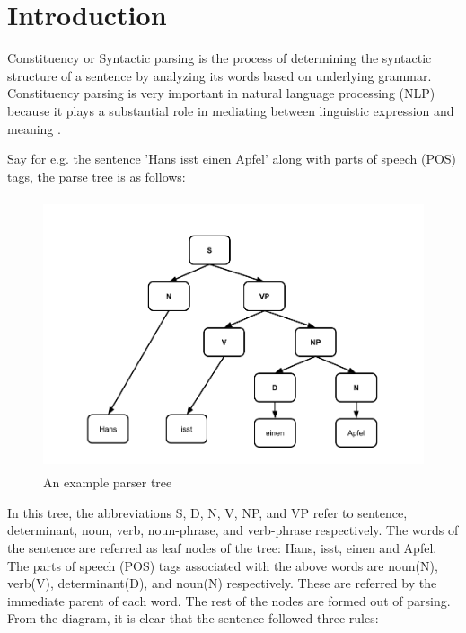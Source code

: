 \documentclass[a4paper, 11pt]{article}
\begin{document}
\tableofcontents
\pagebreak

\listoffigures
\pagebreak

\listoftables
\pagebreak

\clearpage

\section{Introduction}
\frenchspacing

Constituency or Syntactic parsing is the process of determining the syntactic structure of a sentence by analyzing its words based on underlying grammar. Constituency parsing is very important in natural language processing (NLP) because it plays a substantial role in mediating between linguistic expression and meaning \parencite{Socher}. 

Say for e.g. the sentence 'Hans isst einen Apfel' along with parts of speech (POS) tags, the parse tree is as follows:

\begin{figure}[htpb]
    \centering
    \includegraphics[width=\textwidth,height=8cm,keepaspectratio=true]
    {hans-eats-apples.png}
    \caption{
        An example parser tree
    }
    \label{fig:An example parser tree network}
\end{figure}

In this tree, the abbreviations S, D, N, V, NP, and VP refer to sentence, determinant, noun, verb, noun-phrase, and verb-phrase respectively. The words of the sentence are referred as leaf nodes of the tree: Hans, isst, einen and Apfel. The parts of speech (POS) tags associated with the above words are noun(N), verb(V), determinant(D), and noun(N) respectively. These are referred by the immediate parent of each word. The rest of the nodes are formed out of parsing. From the diagram, it is clear that the sentence followed three rules:
\end{document}
